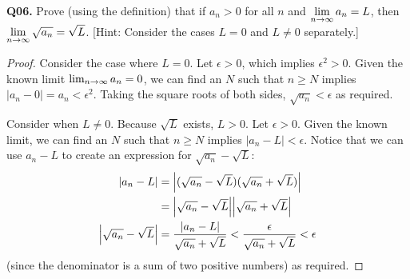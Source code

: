 \documentclass[11pt]{article}
\begin{document}
\textbf{Q06.}
Prove (using the definition) that if $a_n>0$ for all $n$ and $\displaystyle\lim_{n\to\infty}a_n=L$, then  $\displaystyle\lim_{n\to\infty}\sqrt{a_n}=\sqrt{L}$.
  [Hint: Consider the cases $L=0$ and $L\neq0$ separately.]
\begin{proof}
  Consider the case where $L=0$.
  Let $\epsilon > 0$, which implies $\epsilon^2>0$.
  Given the known limit $\lim_{n\to\infty}a_n=0$, we can find an $N$ such that $n \geq N$ implies $|a_n-0|=a_n<\epsilon^2$.
  Taking the square roots of both sides, $\sqrt{a_n}<\epsilon$ as required.

  Consider when $L\neq0$.
  Because $\sqrt{L}$ exists, $L > 0$.
  Let $\epsilon > 0$.
  Given the known limit, we can find an $N$ such that $n \geq N$ implies $|a_n-L| < \epsilon$.
  Notice that we can use $a_n-L$ to create an expression for $\sqrt{a_n}-\sqrt{L}$:
  \begin{align*}
    |a_n-L|                   & =\abs{(\sqrt{a_n}-\sqrt{L})(\sqrt{a_n}+\sqrt{L})}                                       \\
                              & =\abs{\sqrt{a_n}-\sqrt{L}}\abs{\sqrt{a_n}+\sqrt{L}}                                     \\
    \abs{\sqrt{a_n}-\sqrt{L}} & = \frac{|a_n-L|}{\sqrt{a_n}+\sqrt{L}} < \frac{\epsilon}{\sqrt{a_n}+\sqrt{L}} < \epsilon
  \end{align*}
  (since the denominator is a sum of two positive numbers) as required.
\end{proof}
\end{document}
